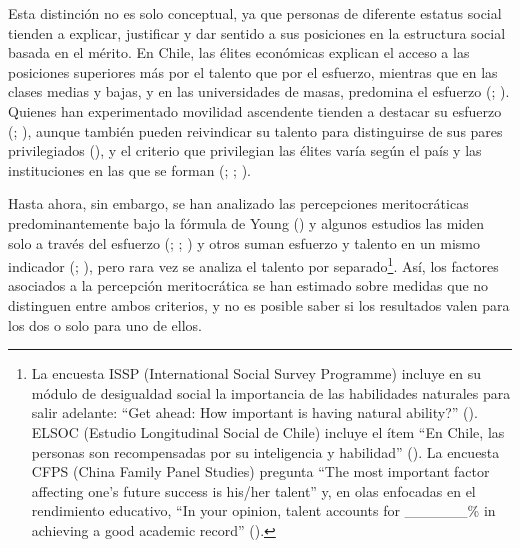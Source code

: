 \documentclass[
  spanish,
  a4paper,
  oneside]{scrbook}
\begin{document}
Esta distinción no es solo conceptual, ya que personas de diferente
estatus social tienden a explicar, justificar y dar sentido a sus
posiciones en la estructura social basada en el mérito. En Chile, las
élites económicas explican el acceso a las posiciones superiores más por
el talento que por el esfuerzo, mientras que en las clases medias y
bajas, y en las universidades de masas, predomina el esfuerzo
(; ). Quienes han experimentado movilidad ascendente tienden a
destacar su esfuerzo (; ), aunque
también pueden reivindicar su talento para distinguirse de sus pares
privilegiados (), y
el criterio que privilegian las élites varía según el país y las
instituciones en las que se forman
(;
;
).

Hasta ahora, sin embargo, se han analizado las percepciones
meritocráticas predominantemente bajo la fórmula de Young
() y algunos estudios las miden solo a
través del esfuerzo (; ;
) y otros
suman esfuerzo y talento en un mismo indicador
(;
), pero rara vez se analiza el talento por separado\footnote{La
  encuesta ISSP (International Social Survey Programme) incluye en su
  módulo de desigualdad social la importancia de las habilidades
  naturales para salir adelante: ``Get ahead: How important is having
  natural ability?'' (). ELSOC (Estudio Longitudinal Social de Chile) incluye el ítem
  ``En Chile, las personas son recompensadas por su inteligencia y
  habilidad'' (). La encuesta
  CFPS (China Family Panel Studies) pregunta ``The most important factor
  affecting one's future success is his/her talent'' y, en olas
  enfocadas en el rendimiento educativo, ``In your opinion, talent
  accounts for \_\_\_\_\_\_\% in achieving a good academic record''
  ().}. Así, los factores asociados a la percepción
meritocrática se han estimado sobre medidas que no distinguen entre
ambos criterios, y no es posible saber si los resultados valen para los
dos o solo para uno de ellos.
\end{document}
